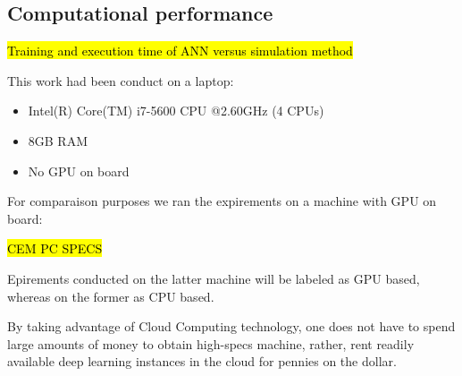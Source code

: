 \documentclass[draft, a4, 10pt, onecolumn]{IEEEtran}
\begin{document}
\subsection{Computational performance}

\hl{Training and execution time of ANN versus simulation method}


This work had been conduct on a  laptop: 

\begin{itemize}
\item Intel(R) Core(TM) i7-5600 CPU @2.60GHz (4 CPUs)
\item 8GB RAM
\item No GPU on board
\end{itemize}

For comparaison purposes we ran the expirements on a machine with GPU on board:

\hl{CEM PC SPECS}

Epirements conducted on the latter machine will be labeled as GPU based, whereas on the former as CPU based.

By taking advantage of Cloud Computing technology, one does not have to spend large amounts of money to obtain high-specs machine, rather, rent readily available deep learning instances in the cloud for pennies on the dollar. 
\end{document}
